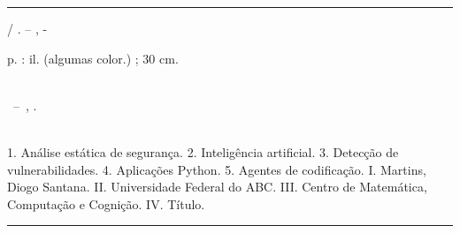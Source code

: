 %
%     
\begin{fichacatalografica}
	\vspace*{\fill}					%
	\hrule							%
	\begin{center}					%
	\begin{minipage}[c]{12.5cm}		%
	
	\imprimirautor
	
	\hspace{0.5cm} \imprimirtitulo  / \imprimirautor. --
	\imprimirlocal, \imprimirdata-
	
	\hspace{0.5cm} \pageref{LastPage} p. : il. (algumas color.) ; 30 cm.\\
	
	\hspace{0.5cm} \imprimirorientadorRotulo~\imprimirorientador\\
	
	\hspace{0.5cm}
	\parbox[t]{\textwidth}{\imprimirtipotrabalho~--~\imprimirinstituicao,
	\imprimirdata.}\\
	
	\hspace{0.5cm}
		1. Análise estática de segurança.
		2. Inteligência artificial.
		3. Detecção de vulnerabilidades.
		4. Aplicações Python.
		5. Agentes de codificação.
		I. Martins, Diogo Santana.
		II. Universidade Federal do ABC.
		III. Centro de Matemática, Computação e Cognição.
		IV. Título.\\

	
	\end{minipage}
	\end{center}
	\hrule
\end{fichacatalografica}
